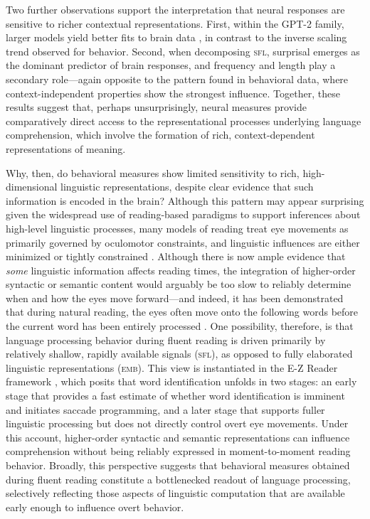 \documentclass[11pt]{article}
\begin{document}
\smallskip 

Two further observations support the interpretation that neural responses are sensitive to richer contextual representations. First, within the GPT-2 family, larger models yield better fits to brain data \citep[see also][]{schrimpf2021neural, antonello2023scaling}, in contrast to the inverse scaling trend observed for behavior. Second, when decomposing \textsc{sfl}, surprisal emerges as the dominant predictor of brain responses, and frequency and length play a secondary role---again opposite to the pattern found in behavioral data, where context-independent properties show the strongest influence. Together, these results suggest that, perhaps unsurprisingly, neural measures provide comparatively direct access to the representational processes underlying language comprehension, which involve the formation of rich, context-dependent representations of meaning.


\smallskip

Why, then, do behavioral measures show limited sensitivity to rich, high-dimensional linguistic representations, despite clear evidence that such information is encoded in the brain? Although this pattern may appear surprising given the widespread use of reading-based paradigms to support inferences about high-level linguistic processes, many models of reading treat eye movements as primarily governed by oculomotor constraints, and linguistic influences are either minimized or tightly constrained \citep{suppes1990eye, suppes1994, strategy-tactics-models}. Although there is now ample evidence that \textit{some} linguistic information affects reading times, the integration of higher-order syntactic or semantic content would arguably be too slow to reliably determine when and how the eyes move forward---and indeed, it has been demonstrated that during natural reading, the eyes often move onto the following words before the current word has been entirely processed \citep{clifton2016eye}. One possibility, therefore, is that language processing behavior during fluent reading is driven primarily by relatively shallow, rapidly available signals (\textsc{sfl}), as opposed to fully elaborated linguistic representations (\textsc{emb}). This view is instantiated in the E-Z Reader framework \citep{reichle1998toward, reichle1999eye, reichle2003ez}, which posits that word identification unfolds in two stages: an early stage that provides a fast estimate of whether word identification is imminent and initiates saccade programming, and a later stage that supports fuller linguistic processing but does not directly control overt eye movements. Under this account, higher-order syntactic and semantic representations can influence comprehension without being reliably expressed in moment-to-moment reading behavior. Broadly, this perspective suggests that behavioral measures obtained during fluent reading constitute a bottlenecked readout of language processing, selectively reflecting those aspects of linguistic computation that are available early enough to influence overt behavior.
\end{document}

